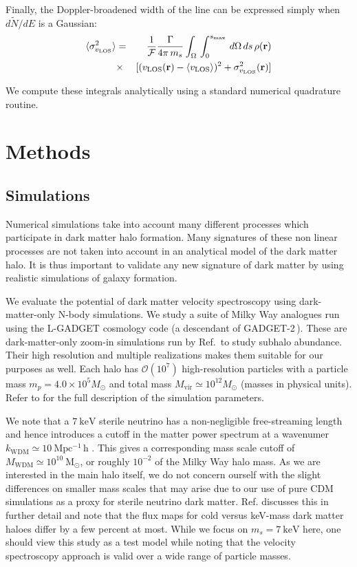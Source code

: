 \documentclass[aps,prd,10pt,twocolumn,superscriptaddress,showpacs]{revtex4-1}
\newcommand{\br}[0]{\mathbf{r}}
\newcommand{\los}[0]{\mathrm{LOS}}
\newcommand{\units}[1]{~\mathrm{#1}}
\begin{document}
Finally, the Doppler-broadened width of the line can be expressed simply when $d\tilde{N}/dE$ is a Gaussian:
\begin{eqnarray}
	\langle \sigma_{v_\los}^2 \rangle &=& \frac{1}{\mathcal{F}}\frac{\Gamma}{4\pi \, m_s} 
	\int _\Omega \, \int _0 ^{s_{\rm max}}  \, d\Omega\,ds \, \rho(\br)\nonumber \\ 
	&\times&   [(v_\los(\br)-\langle v_\los\rangle)^2+\sigma_{v_\los}^2(\br)] 
\label{eq:lineshift}
\end{eqnarray}

We compute these integrals analytically using a standard numerical quadrature routine.



\section{Methods}

\subsection{Simulations}
\label{sec:simulations}

Numerical simulations take into account many different processes which participate in dark matter halo formation.  Many signatures of these non linear processes are not taken into account in an analytical model of the dark matter halo.  It is thus important to validate any new signature of dark matter by using realistic simulations of galaxy formation.

We evaluate the potential of dark matter velocity spectroscopy using dark-matter-only N-body
simulations.  We study a suite of Milky Way analogues run using the L-GADGET cosmology code (a
descendant of GADGET-2\,\cite{springel2005}). These are dark-matter-only zoom-in simulations run by
Ref.\,\cite{mao2015} to study subhalo abundance. Their high resolution and multiple realizations
makes them suitable for our purposes as well. Each halo has $\mathcal{O}(10^7)$ high-resolution
particles with a particle mass $m_p=4.0 \times 10^5 M_{\odot}$ and total  mass
$M_{\mathrm{vir}}\simeq 10^{12} M_{\odot}$ (masses in physical units). Refer to \cite{mao2015} for
the full description of the simulation parameters.

We note that a $7\units{keV}$ sterile neutrino has a non-negligible free-streaming length 
and hence introduces a cutoff in
the matter power spectrum at a wavenumer $k_\mathrm{WDM} \simeq 10 \units{Mpc^{-1}\,h}$
\cite{ven2016}. This gives a corresponding mass scale cutoff of $M_\mathrm{WDM} \simeq 10^{10}
\units{M_\odot}$, or roughly $10^{-2}$ of the Milky Way halo mass. As we are interested in the main
halo itself, we do not concern ourself with the slight differences on smaller mass scales that may
arise due to our use of pure CDM simulations as a proxy for sterile neutrino dark matter. Ref. \cite{Lovell:2014lea}
discusses this in further detail and note that the flux maps for cold versus keV-mass dark matter
haloes differ by a few percent at most. While we focus on $m_s=7\units{keV}$ here,
one should view this study as a test model while noting that the velocity spectroscopy approach is
valid over a wide range of particle masses.
\end{document}
